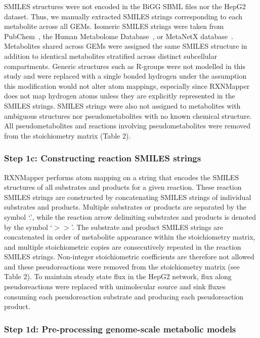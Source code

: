 \documentclass[12pt]{article}
\begin{document}
SMILES structures were not encoded in the BiGG SBML files nor the HepG2
dataset. Thus, we manually extracted SMILES strings corresponding to each
metabolite across all GEMs. Isomeric SMILES strings were taken from
PubChem~\citep{KimSunghwan2023P2u}, the Human Metabolome
Database~\citep{WishartDavidS2022H5tH}, or MetaNetX
database~\citep{MorettiSebastien2021Munf}. Metabolites shared across GEMs
were assigned the same SMILES structure in addition to identical
metabolites stratified across distinct subcellular compartments. Generic
structures such as R-groups were not modelled in this study and were
replaced with a single bonded hydrogen under the assumption this
modification would not alter atom mappings, especially since RXNMapper
does not map hydrogen atoms unless they are explicitly represented in the
SMILES strings. SMILES strings were also not assigned to metabolites with
ambiguous structures nor pseudometabolites with no known chemical
structure. All pseudometabolites and reactions involving pseudometabolites
were removed from the stoichiometry matrix (Table 2).

\subsubsection*{Step 1c: Constructing reaction SMILES strings}

RXNMapper performs atom mapping on a string that encodes the SMILES
structures of all substrates and products for a given reaction. These
reaction SMILES strings are constructed by concatenating SMILES strings of
individual substrates and products. Multiple substrates or products are
separated by the symbol `.', while the reaction arrow delimiting
substrates and products is denoted by the symbol `$>>$'. The substrate and
product SMILES strings are concatenated in order of metabolite appearance
within the stoichiometry matrix, and multiple stoichiometric copies are
consecutively repeated in the reaction SMILES strings. Non-integer
stoichiometric coefficients are therefore not allowed and these
pseudoreactions were removed from the stoichiometry matrix (see Table 2).
To maintain steady state flux in the HepG2 network, flux along
pseudoreactions were replaced with unimolecular source and sink fluxes
consuming each pseudoreaction substrate and producing each pseudoreaction
product.

\subsubsection*{Step 1d: Pre-processing genome-scale metabolic models}
\end{document}
